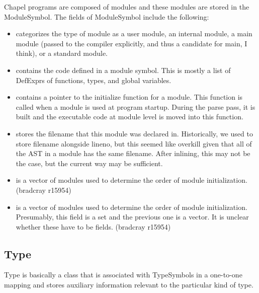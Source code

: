 \documentclass[10pt]{article}
\begin{document}
Chapel programs are composed of modules and these modules are stored
in the ModuleSymbol.  The fields of ModuleSymbol include the
following:
\begin{itemize}
\item {} categorizes the type of module as a user
  module, an internal module, a main module (passed to the compiler
  explicitly, and thus a candidate for main, I think), or a standard
  module.
\item {} contains the code defined in a module
  symbol.  This is mostly a list of DefExprs of functions, types, and
  global variables.
\item {} contains a pointer to the initialize
  function for a module.  This function is called when a module is
  used at program startup.  During the parse pass, it is built and the
  executable code at module level is moved into this function.
\item {} stores the filename that this module
  was declared in.  Historically, we used to store filename alongside
  lineno, but this seemed like overkill given that all of the AST in a
  module has the same filename.  After inlining, this may not be the
  case, but the current way may be sufficient.
\item {} is a vector of modules used
  to determine the order of module initialization. (bradcray r15954)
\item {} is a vector of modules used to
  determine the order of module initialization.  Presumably, this
  field is a set and the previous one is a vector.  It is unclear
  whether these have to be fields. (bradcray r15954)
\end{itemize}

\subsection{Type}

Type is basically a class that is associated with TypeSymbols in a
one-to-one mapping and stores auxiliary information relevant to the
particular kind of type.
\end{document}
